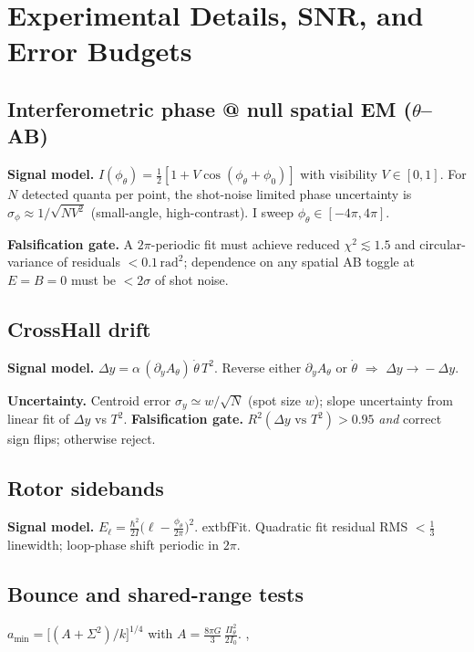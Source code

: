 \section*{Experimental Details, SNR, and Error Budgets}

\subsection*{Interferometric phase @ null spatial EM ($\theta$--AB)}
\textbf{Signal model.} $I(\phi_\theta)=\tfrac{1}{2}\!\left[1+V\cos(\phi_\theta+\phi_0)\right]$ with visibility $V\in[0,1]$.
For $N$ detected quanta per point, the shot-noise limited phase uncertainty is
$\sigma_\phi \approx 1/\sqrt{N V^2}$ (small-angle, high-contrast). I sweep $\phi_\theta\in[-4\pi,4\pi]$.

\textbf{Falsification gate.} A $2\pi$-periodic fit must achieve reduced $\chi^2\!\lesssim\!1.5$ and circular-variance of residuals $<0.1\,\mathrm{rad}^2$; dependence on any spatial AB toggle at $E{=}B{=}0$ must be $<2\sigma$ of shot noise.

\subsection*{Cross\textendash Hall drift}
\textbf{Signal model.} $\Delta y = \alpha\,(\partial_y A_\theta)\,\dot\theta\,T^2$. Reverse either $\partial_y A_\theta$ or $\dot\theta$ $\Rightarrow$ $\Delta y\!\to\! -\Delta y$.

\textbf{Uncertainty.} Centroid error $\sigma_y \simeq w/\sqrt{N}$ (spot size $w$); slope uncertainty from linear fit of $\Delta y$ vs $T^2$.  
\textbf{Falsification gate.} $R^2(\Delta y\text{ vs }T^2)\!>\!0.95$ \emph{and} correct sign flips; otherwise reject.

\subsection*{Rotor sidebands}
\textbf{Signal model.} $E_\ell=\frac{\hbar^2}{2I}\big(\ell-\frac{\phi_\theta}{2\pi}\big)^2$.  
	extbf{Fit.} Quadratic fit residual RMS $<\tfrac{1}{3}$ linewidth; loop-phase shift periodic in $2\pi$.  

\subsection*{Bounce and shared-range tests}
$a_{\min}=\big[(A+\Sigma^2)/k\big]^{1/4}$ with $A=\tfrac{8\pi G}{3}\,\tfrac{\Pi_\theta^2}{2I_0}$.  
, 
